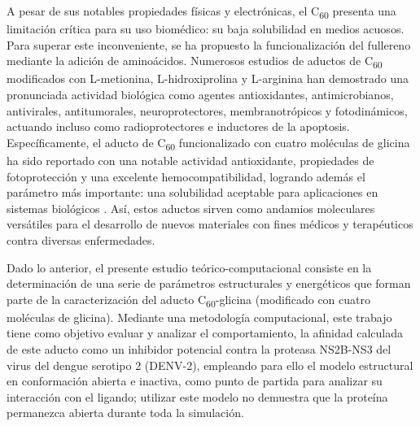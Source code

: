 A pesar de sus notables propiedades físicas y electrónicas, el C\textsubscript{60} presenta una limitación crítica para su uso biomédico: su baja solubilidad en medios acuosos. Para superar este inconveniente, se ha propuesto la funcionalización del fullereno mediante la adición de aminoácidos. Numerosos estudios de aductos de C\textsubscript{60} modificados con L-metionina, L-hidroxiprolina y L-arginina han demostrado una pronunciada actividad biológica como agentes antioxidantes, antimicrobianos, antivirales, antitumorales, neuroprotectores, membranotrópicos y fotodinámicos, actuando incluso como radioprotectores e inductores de la apoptosis. Específicamente, el aducto de C\textsubscript{60} funcionalizado con cuatro moléculas de glicina ha sido reportado con una notable actividad antioxidante, propiedades de fotoprotección y una excelente hemocompatibilidad, logrando además el parámetro más importante: una solubilidad aceptable para aplicaciones en sistemas biológicos \cite{sharoyko2021biologically}. Así, estos aductos sirven como andamios moleculares versátiles para el desarrollo de nuevos materiales con fines médicos y terapéuticos contra diversas enfermedades.

Dado lo anterior, el presente estudio teórico-computacional consiste en la determinación de una serie de parámetros estructurales y energéticos que forman parte de la caracterización del aducto C\textsubscript{60}-glicina (modificado con cuatro moléculas de glicina). Mediante una metodología computacional, este trabajo tiene como objetivo evaluar y analizar el comportamiento, la afinidad calculada de este aducto como un inhibidor potencial contra la proteasa NS2B-NS3 del virus del dengue serotipo 2 (DENV-2), empleando para ello el modelo estructural en conformación abierta e inactiva, como punto de partida para analizar su interacción con el ligando; utilizar este modelo no demuestra que la proteína permanezca abierta durante toda la simulación.



